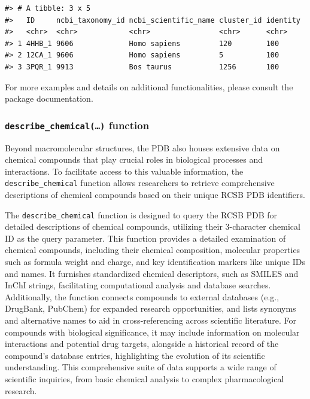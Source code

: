 \begin{verbatim}
#> # A tibble: 3 x 5
#>   ID     ncbi_taxonomy_id ncbi_scientific_name cluster_id identity
#>   <chr>  <chr>            <chr>                <chr>      <chr>   
#> 1 4HHB_1 9606             Homo sapiens         120        100     
#> 2 12CA_1 9606             Homo sapiens         5          100     
#> 3 3PQR_1 9913             Bos taurus           1256       100
\end{verbatim}

For more examples and details on additional functionalities, please consult the package documentation.

\subsubsection{\texorpdfstring{\texttt{describe\_chemical(…)} function}{describe\_chemical(\ldots) function}}\label{describe_chemical-function}

Beyond macromolecular structures, the PDB also houses extensive data on chemical compounds that play crucial roles in biological processes and interactions. To facilitate access to this valuable information, the \texttt{describe\_chemical} function allows researchers to retrieve comprehensive descriptions of chemical compounds based on their unique RCSB PDB identifiers.

The \texttt{describe\_chemical} function is designed to query the RCSB PDB for detailed descriptions of chemical compounds, utilizing their 3-character chemical ID as the query parameter. This function provides a detailed examination of chemical compounds, including their chemical composition, molecular properties such as formula weight and charge, and key identification markers like unique IDs and names. It furnishes standardized chemical descriptors, such as SMILES and InChI strings, facilitating computational analysis and database searches. Additionally, the function connects compounds to external databases (e.g., DrugBank, PubChem) for expanded research opportunities, and lists synonyms and alternative names to aid in cross-referencing across scientific literature. For compounds with biological significance, it may include information on molecular interactions and potential drug targets, alongside a historical record of the compound's database entries, highlighting the evolution of its scientific understanding. This comprehensive suite of data supports a wide range of scientific inquiries, from basic chemical analysis to complex pharmacological research.


